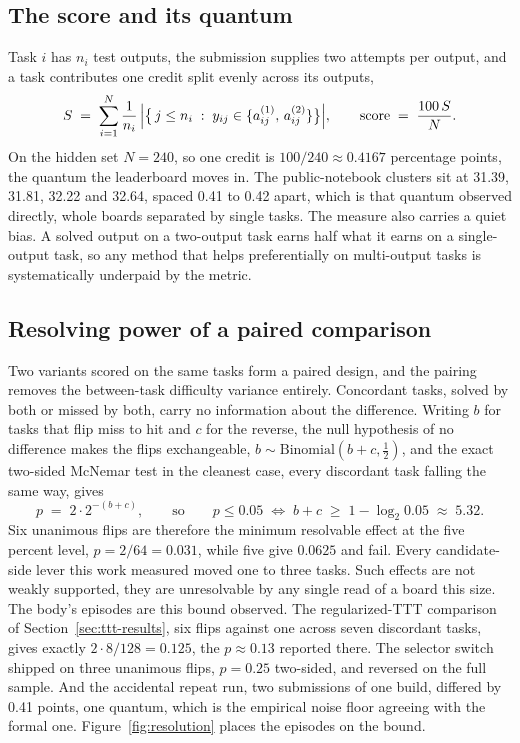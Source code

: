 \documentclass[11pt]{article}
\begin{document}
\subsection{The score and its quantum}

Task $i$ has $n_i$ test outputs, the submission supplies two attempts per output, and a task contributes
one credit split evenly across its outputs,
\begin{equation}
S \;=\; \sum_{i=1}^{N}\frac{1}{n_i}\,\Bigl|\bigl\{\, j \le n_i \;:\; y_{ij}\in\{a^{(1)}_{ij},\,
a^{(2)}_{ij}\}\bigr\}\Bigr|,
\qquad \text{score} \;=\; \frac{100\,S}{N}.
\label{eq:score}
\end{equation}
On the hidden set $N=240$, so one credit is $100/240 \approx 0.4167$ percentage points, the quantum the
leaderboard moves in. The public-notebook clusters sit at 31.39, 31.81, 32.22 and 32.64, spaced 0.41 to
0.42 apart, which is that quantum observed directly, whole boards separated by single tasks. The measure
also carries a quiet bias. A solved output on a two-output task earns half what it earns on a single-output
task, so any method that helps preferentially on multi-output tasks is systematically underpaid by the
metric.

\subsection{Resolving power of a paired comparison}

Two variants scored on the same tasks form a paired design, and the pairing removes the between-task
difficulty variance entirely. Concordant tasks, solved by both or missed by both, carry no information
about the difference. Writing $b$ for tasks that flip miss to hit and $c$ for the reverse, the null
hypothesis of no difference makes the flips exchangeable, $b \sim \mathrm{Binomial}(b+c,\tfrac12)$, and the
exact two-sided McNemar test in the cleanest case, every discordant task falling the same way, gives
\begin{equation}
p \;=\; 2\cdot 2^{-(b+c)},
\qquad\text{so}\qquad
p \le 0.05 \;\Longleftrightarrow\; b+c \;\ge\; 1-\log_2 0.05 \;\approx\; 5.32.
\label{eq:mcnemar}
\end{equation}
Six unanimous flips are therefore the minimum resolvable effect at the five percent level, $p = 2/64 =
0.031$, while five give $0.0625$ and fail. Every candidate-side lever this work measured moved one to three
tasks. Such effects are not weakly supported, they are unresolvable by any single read of a board this
size. The body's episodes are this bound observed. The regularized-TTT comparison of
Section~\ref{sec:ttt-results}, six flips against one across seven discordant tasks, gives exactly $2 \cdot 8/128 =
0.125$, the $p \approx 0.13$ reported there. The selector switch shipped on three unanimous flips, $p =
0.25$ two-sided, and reversed on the full sample. And the accidental repeat run, two submissions of one
build, differed by 0.41 points, one quantum, which is the empirical noise floor agreeing with the formal
one. Figure~\ref{fig:resolution} places the episodes on the bound.
\end{document}
